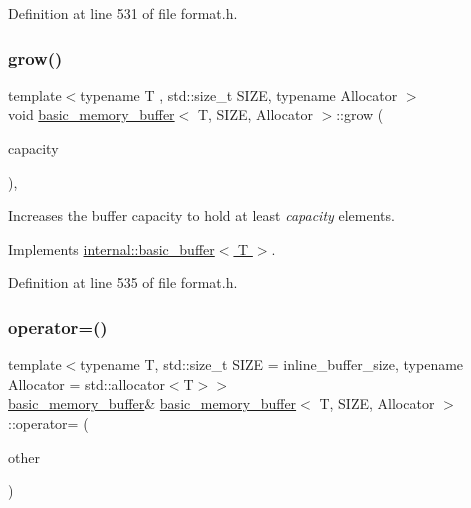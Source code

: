 Definition at line 531 of file format.\+h.

\mbox{\label{classbasic__memory__buffer_a2f01489b9805a99cdc93ab0aee6730eb}} 
\subsubsection{\texorpdfstring{grow()}{grow()}}
{\footnotesize\ttfamily template$<$typename T , std\+::size\+\_\+t S\+I\+ZE, typename Allocator $>$ \\
void \hyperlink{classbasic__memory__buffer}{basic\+\_\+memory\+\_\+buffer}$<$ T, S\+I\+ZE, Allocator $>$\+::grow (\begin{DoxyParamCaption}\item[{std\+::size\+\_\+t}]{capacity }\end{DoxyParamCaption})\hspace{0.3cm}{\ttfamily [protected]}, {\ttfamily [virtual]}}

Increases the buffer capacity to hold at least {\itshape capacity} elements. 

Implements \hyperlink{classinternal_1_1basic__buffer_a01fbeed379e2af2c79baf5c9b5dc92e8}{internal\+::basic\+\_\+buffer$<$ T $>$}.



Definition at line 535 of file format.\+h.

\mbox{\label{classbasic__memory__buffer_ae03c16a826d5ebaf1754467f40d0b7ba}} 
\subsubsection{\texorpdfstring{operator=()}{operator=()}}
{\footnotesize\ttfamily template$<$typename T, std\+::size\+\_\+t S\+I\+ZE = inline\+\_\+buffer\+\_\+size, typename Allocator = std\+::allocator$<$\+T$>$$>$ \\
\hyperlink{classbasic__memory__buffer}{basic\+\_\+memory\+\_\+buffer}\& \hyperlink{classbasic__memory__buffer}{basic\+\_\+memory\+\_\+buffer}$<$ T, S\+I\+ZE, Allocator $>$\+::operator= (\begin{DoxyParamCaption}\item[{\hyperlink{classbasic__memory__buffer}{basic\+\_\+memory\+\_\+buffer}$<$ T, S\+I\+ZE, Allocator $>$ \&\&}]{other }\end{DoxyParamCaption})\hspace{0.3cm}{\ttfamily [inline]}}

